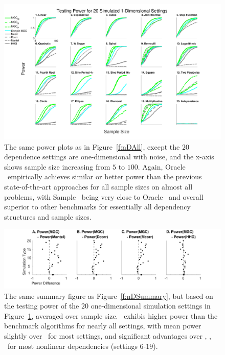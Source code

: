 \documentclass[11pt]{article}
\begin{document}
\begin{figure}[htbp]
\includegraphics[width=1.0\textwidth,trim={0 0.5cm 3.2cm 0},clip]{Figures/Fig1DPowerAll}
\caption{
The same power plots as in Figure~\ref{f:nDAll}, except the $20$ dependence settings are one-dimensional with noise, and the x-axis shows sample size increasing from $5$ to $100$. 
Again, Oracle \Mgc~empirically achieves similar or better power than the previous state-of-the-art approaches for all sample sizes on almost all problems, with Sample \Mgc~being very close to Oracle \Mgc~and overall superior to other benchmarks for essentially all dependency structures and sample sizes.}
\label{f:1DAll}
\end{figure}

\begin{figure}
  \centering
  \includegraphics[width=1.0\textwidth,trim={3.5cm 0 3.5cm 0},clip]{Figures/Fig1DPowerMGCM}
  \caption{The same summary figure as Figure~\ref{f:nDSummary}, but based on the testing power of the $20$ one-dimensional simulation settings in Figure~\ref{f:1DAll}, averaged over sample size. 
  \Mgc~exhibis higher power than the benchmark algorithms for nearly all settings, with mean power slightly over \Hhg~for most settings, and  significant advantages over \Mantel, \Dcorr, \Mcorr~for most nonlinear dependencies (settings $6$-$19$).}
\label{f:1DSummary}
\end{figure}
\end{document}
